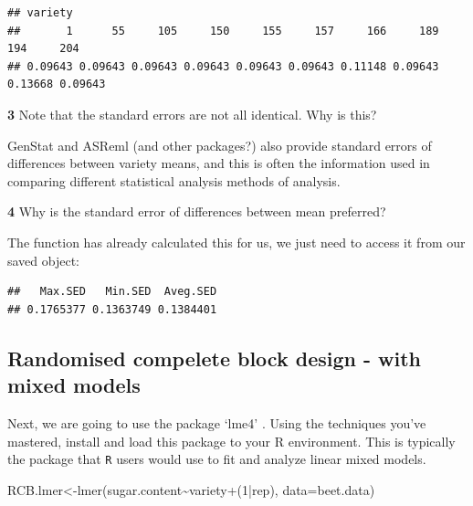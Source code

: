\documentclass[
]{book}
\makeatletter
\newenvironment{Shaded}{\begin{snugshade}}{\end{snugshade}}
\newcommand{\AttributeTok}[1]{\textcolor[rgb]{0.77,0.63,0.00}{#1}}
\newcommand{\DecValTok}[1]{\textcolor[rgb]{0.00,0.00,0.81}{#1}}
\newcommand{\FunctionTok}[1]{\textcolor[rgb]{0.00,0.00,0.00}{#1}}
\newcommand{\NormalTok}[1]{#1}
\newcommand{\OtherTok}[1]{\textcolor[rgb]{0.56,0.35,0.01}{#1}}
\newcommand{\SpecialCharTok}[1]{\textcolor[rgb]{0.00,0.00,0.00}{#1}}
\newcommand{\StringTok}[1]{\textcolor[rgb]{0.31,0.60,0.02}{#1}}
\newenvironment{kframe}{%
\medskip{}
\setlength{\fboxsep}{.8em}
 \def\at@end@of@kframe{}%
 \ifinner\ifhmode%
  \def\at@end@of@kframe{\end{minipage}}%
  \begin{minipage}{\columnwidth}%
 \fi\fi%
 \def\FrameCommand##1{\hskip\@totalleftmargin \hskip-\fboxsep
 \colorbox{shadecolor}{##1}\hskip-\fboxsep
     \hskip-\linewidth \hskip-\@totalleftmargin \hskip\columnwidth}%
 \MakeFramed {\advance\hsize-\width
   \@totalleftmargin\z@ \linewidth\hsize
   \@setminipage}}%
 {\par\unskip\endMakeFramed%
 \at@end@of@kframe}
\newenvironment{rmdblock}[1]
  {
  \begin{itemize}
  \renewcommand{\labelitemi}{
    \raisebox{-.7\height}[0pt][0pt]{
      {\setkeys{Gin}{width=3em,keepaspectratio}\texttt{[image: images/\#1]}}
    }
  }
  \setlength{\fboxsep}{1em}
  \begin{kframe}
  \item
  }
  {
  \end{kframe}
  \end{itemize}
  }
\newenvironment{rmdquiz}
  {\begin{rmdblock}{quiz}}
  {\end{rmdblock}}
\makeatother
\begin{document}
\begin{verbatim}
## variety
##       1      55     105     150     155     157     166     189     194     204 
## 0.09643 0.09643 0.09643 0.09643 0.09643 0.09643 0.11148 0.09643 0.13668 0.09643
\end{verbatim}

\begin{rmdquiz}
\textbf{3} Note that the standard errors are not all identical. Why is this?
\end{rmdquiz}

GenStat and ASReml (and other packages?) also provide standard errors of differences between variety means, and this is often the information used in comparing different statistical analysis methods of analysis.

\begin{rmdquiz}
\textbf{4} Why is the standard error of differences between mean preferred?
\end{rmdquiz}

The function has already calculated this for us, we just need to access it from our saved object:

\begin{Shaded}
\end{Shaded}

\begin{verbatim}
##   Max.SED   Min.SED  Aveg.SED 
## 0.1765377 0.1363749 0.1384401
\end{verbatim}

\hypertarget{randomised-compelete-block-design---with-mixed-models}{%
\subsection{Randomised compelete block design - with mixed models}\label{randomised-compelete-block-design---with-mixed-models}}

Next, we are going to use the package `lme4' \citep{R-lme4}. Using the techniques you've mastered, install and load this package to your R environment. This is typically the package that \texttt{R} users would use to fit and analyze linear mixed models.

\begin{Shaded}
\begin{Highlighting}[]
\NormalTok{RCB.lmer}\OtherTok{\textless{}{-}}\FunctionTok{lmer}\NormalTok{(sugar.content}\SpecialCharTok{\textasciitilde{}}\NormalTok{variety}\SpecialCharTok{+}\NormalTok{(}\DecValTok{1}\SpecialCharTok{|}\NormalTok{rep), }\AttributeTok{data=}\NormalTok{beet.data)}
\end{Highlighting}
\end{Shaded}
\end{document}
